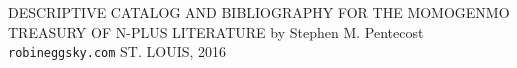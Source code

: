 \newpage
\begin{center}
\vspace*{5mm}
{\Huge
DESCRIPTIVE CATALOG
\linebreak
\linebreak
AND
\linebreak
\linebreak
BIBLIOGRAPHY
\linebreak
\linebreak
FOR THE
\linebreak
\linebreak
MOMOGENMO TREASURY
\linebreak
\linebreak
OF
\linebreak
\linebreak
N-PLUS LITERATURE
\linebreak
\linebreak
}
{\Large
\linebreak
\linebreak
\linebreak
by
\linebreak
\linebreak
\linebreak
}
{\huge
Stephen M. Pentecost
}
\linebreak
\linebreak
\linebreak
\linebreak
\linebreak
\linebreak
\linebreak
\linebreak
{\LARGE 
\texttt{robineggsky.com}
}
\linebreak
\linebreak
{\Large 
ST. LOUIS, 2016
}
\end{center}
